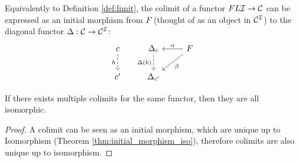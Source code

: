 \begin{definition}
	Equivalently to Definition \ref{def:limit}, the colimit of a functor $FL\mathcal{I}\to
	\mathcal{C}$ can be expressed as an initial morphism from $F$ (thought of as an object in $\mathcal{C}^{\mathcal{I}}$) to the diagonal functor $\Delta:\mathcal{C}\to\mathcal{C}^{\mathcal{I}}$:
	\[\begin{tikzcd}[ampersand replacement=\&]
		c \& {\Delta_c} \& F \\
		{c'} \& {\Delta_{c'}}
		\arrow["h"', dashed, from=1-1, to=2-1]
		\arrow["{\Delta(h)}"', dashed, from=1-2, to=2-2]
		\arrow["\beta", from=1-3, to=2-2]
		\arrow["\alpha"', from=1-3, to=1-2]
	\end{tikzcd}\]
\end{definition}

\begin{theorem}
	If there exists multiple colimits for the same functor, then they are all
	isomorphic.

	\begin{proof}
		A colimit can be seen as an initial morphism, which are unique up to
		Isomorphism (Theorem \ref{thm:initial_morphism_iso}), therefore colimits are
		also unique up to isomorphism.
	\end{proof}
\end{theorem}